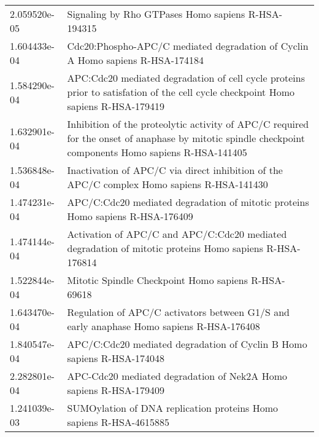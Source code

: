\begin{longtable}{p{2.4cm}p{14.5cm}}
             2.059520e-05 &                                                                                                     Signaling by Rho GTPases Homo sapiens R-HSA-194315 \\
             1.604433e-04 &                                                                         Cdc20:Phospho-APC/C mediated degradation of Cyclin A Homo sapiens R-HSA-174184 \\
             1.584290e-04 &                      APC:Cdc20 mediated degradation of cell cycle proteins prior to satisfation of the cell cycle checkpoint Homo sapiens R-HSA-179419 \\
             1.632901e-04 &  Inhibition of the proteolytic activity of APC/C required for the onset of anaphase by mitotic spindle checkpoint components Homo sapiens R-HSA-141405 \\
             1.536848e-04 &                                                             Inactivation of APC/C via direct inhibition of the APC/C complex Homo sapiens R-HSA-141430 \\
             1.474231e-04 &                                                                         APC/C:Cdc20 mediated degradation of mitotic proteins Homo sapiens R-HSA-176409 \\
             1.474144e-04 &                                                 Activation of APC/C and APC/C:Cdc20 mediated degradation of mitotic proteins Homo sapiens R-HSA-176814 \\
             1.522844e-04 &                                                                                                    Mitotic Spindle Checkpoint Homo sapiens R-HSA-69618 \\
             1.643470e-04 &                                                               Regulation of APC/C activators between G1/S and early anaphase Homo sapiens R-HSA-176408 \\
             1.840547e-04 &                                                                                 APC/C:Cdc20 mediated degradation of Cyclin B Homo sapiens R-HSA-174048 \\
             2.282801e-04 &                                                                                      APC-Cdc20 mediated degradation of Nek2A Homo sapiens R-HSA-179409 \\
             1.241039e-03 &                                                                                     SUMOylation of DNA replication proteins Homo sapiens R-HSA-4615885 \\

\end{longtable}

